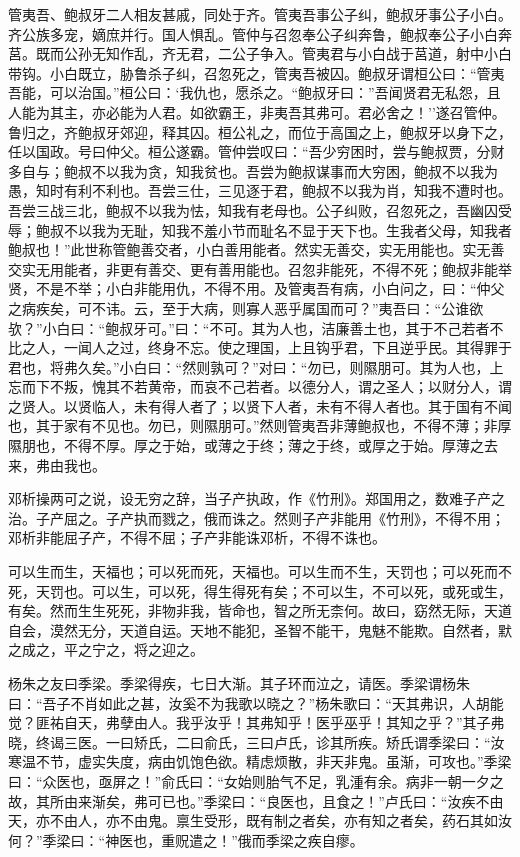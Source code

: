 \documentclass[]{article}
\begin{document}
管夷吾、鲍叔牙二人相友甚戚，同处于齐。管夷吾事公子纠，鲍叔牙事公子小白。齐公族多宠，嫡庶并行。国人惧乱。管仲与召忽奉公子纠奔鲁，鲍叔奉公子小白奔莒。既而公孙无知作乱，齐无君，二公子争入。管夷君与小白战于莒道，射中小白带钩。小白既立，胁鲁杀子纠，召忽死之，管夷吾被囚。鲍叔牙谓桓公曰：``管夷吾能，可以治国。''桓公曰：`我仇也，愿杀之。``鲍叔牙曰：''吾闻贤君无私怨，且人能为其主，亦必能为人君。如欲霸王，非夷吾其弗可。君必舍之！''遂召管仲。鲁归之，齐鲍叔牙郊迎，释其囚。桓公礼之，而位于高国之上，鲍叔牙以身下之，任以国政。号曰仲父。桓公遂霸。管仲尝叹曰：``吾少穷困时，尝与鲍叔贾，分财多自与；鲍叔不以我为贪，知我贫也。吾尝为鲍叔谋事而大穷困，鲍叔不以我为愚，知时有利不利也。吾尝三仕，三见逐于君，鲍叔不以我为肖，知我不遭时也。吾尝三战三北，鲍叔不以我为怯，知我有老母也。公子纠败，召忽死之，吾幽囚受辱；鲍叔不以我为无耻，知我不羞小节而耻名不显于天下也。生我者父母，知我者鲍叔也！''此世称管鲍善交者，小白善用能者。然实无善交，实无用能也。实无善交实无用能者，非更有善交、更有善用能也。召忽非能死，不得不死；鲍叔非能举贤，不是不举；小白非能用仇，不得不用。及管夷吾有病，小白问之，曰：``仲父之病疾矣，可不讳。云，至于大病，则寡人恶乎属国而可？''夷吾曰：``公谁欲欤？''小白曰：``鲍叔牙可。''曰：``不可。其为人也，洁廉善土也，其于不己若者不比之人，一闻人之过，终身不忘。使之理国，上且钩乎君，下且逆乎民。其得罪于君也，将弗久矣。''小白曰：``然则孰可？''对曰：``勿已，则隰朋可。其为人也，上忘而下不叛，愧其不若黄帝，而哀不己若者。以德分人，谓之圣人；以财分人，谓之贤人。以贤临人，未有得人者了；以贤下人者，未有不得人者也。其于国有不闻也，其于家有不见也。勿已，则隰朋可。''然则管夷吾非薄鲍叔也，不得不薄；非厚隰朋也，不得不厚。厚之于始，或薄之于终；薄之于终，或厚之于始。厚薄之去来，弗由我也。

邓析操两可之说，设无穷之辞，当子产执政，作《竹刑》。郑国用之，数难子产之治。子产屈之。子产执而戮之，俄而诛之。然则子产非能用《竹刑》，不得不用；邓析非能屈子产，不得不屈；子产非能诛邓析，不得不诛也。

可以生而生，天福也；可以死而死，天福也。可以生而不生，天罚也；可以死而不死，天罚也。可以生，可以死，得生得死有矣；不可以生，不可以死，或死或生，有矣。然而生生死死，非物非我，皆命也，智之所无柰何。故曰，窈然无际，天道自会，漠然无分，天道自运。天地不能犯，圣智不能干，鬼魅不能欺。自然者，默之成之，平之宁之，将之迎之。

杨朱之友曰季梁。季梁得疾，七日大渐。其子环而泣之，请医。季梁谓杨朱曰：``吾子不肖如此之甚，汝奚不为我歌以晓之？''杨朱歌曰：``天其弗识，人胡能觉？匪祐自天，弗孽由人。我乎汝乎！其弗知乎！医乎巫乎！其知之乎？''其子弗晓，终谒三医。一曰矫氏，二曰俞氏，三曰卢氏，诊其所疾。矫氏谓季梁曰：``汝寒温不节，虚实失度，病由饥饱色欲。精虑烦散，非天非鬼。虽渐，可攻也。''季梁曰：``众医也，亟屏之！''俞氏曰：``女始则胎气不足，乳湩有余。病非一朝一夕之故，其所由来渐矣，弗可已也。''季梁曰：``良医也，且食之！''卢氏曰：``汝疾不由天，亦不由人，亦不由鬼。禀生受形，既有制之者矣，亦有知之者矣，药石其如汝何？''季梁曰：``神医也，重贶遣之！''俄而季梁之疾自瘳。
\end{document}
